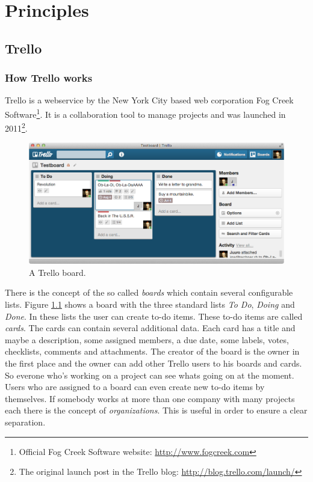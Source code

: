 
\chapter{Principles}
  \label{Principles}

\section{Trello}

\subsection{How Trello works}
Trello is a webservice by the New York City based web corporation Fog Creek Software\footnote{Official Fog Creek Software website: \url{http://www.fogcreek.com}}. It is a collaboration tool to manage projects and was launched in 2011\footnote{The original launch post in the Trello blog: \url{http://blog.trello.com/launch/}}. 

\begin{figure}[htb]
\centering
\includegraphics[width=\textwidth]{figures/trello}
\caption{A Trello board.}
\label{fig:trello}
\end{figure}

There is the concept of the so called \emph{boards} which contain several configurable lists. Figure \ref{fig:trello} shows a board with the three standard lists \emph{To Do}, \emph{Doing} and \emph{Done}. In these lists the user can create to-do items. These to-do items are called \emph{cards}. The cards can contain several additional data. Each card has a title and maybe a description, some assigned members, a due date, some labels, votes, checklists, comments and attachments. The creator of the board is the owner in the first place and the owner can add other Trello users to his boards and cards. So everone who's working on a project can see whats going on at the moment. Users who are assigned to a board can even create new to-do items by themselves. If somebody works at more than one company with many projects each there is the concept of \emph{organizations}. This is useful in order to ensure a clear separation.

